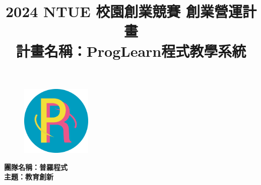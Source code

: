 \documentclass[12pt]{article}
\begin{document}
\title{2024 NTUE 校園創業競賽 創業營運計畫\\
  \vspace{0.5cm}
  \large 計畫名稱：ProgLearn程式教學系統}
\date{}

\maketitle %
\begin{figure}[H]
  \centering
  \includegraphics[width=0.3\textwidth]{images/LOGO.png}
\end{figure}
\begin{center}
  \vspace{12pt}
  \textbf{團隊名稱：普羅程式} \\
  \vspace{12pt}
  \textbf{主題：教育創新} \\
\end{center}
\thispagestyle{empty} %
\newpage


\thispagestyle{empty}
\newpage

\tableofcontents %
\thispagestyle{empty}
\newpage




\setcounter{page}{1}

\newpage
\end{document}
